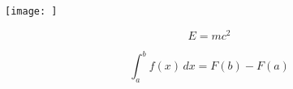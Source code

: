 \documentclass[12pt, a4paper]{article}
\begin{document}
\begin{center}
\texttt{[image: ]}
\label{fig:mpr}
\end{center}

\[
E = mc^2
\]

\[
\int_a^b f(x) \, dx = F(b) - F(a)
\]
\end{document}
